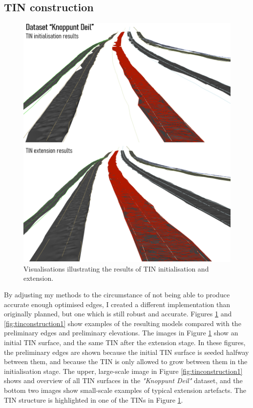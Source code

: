 \subsection{TIN construction}
\label{sub:r_tinconstruction}

\begin{figure}
    \centering
    \includegraphics[width=\linewidth]{final_report/figs/tinconstruction0.png}
    \caption{Visualisations illustrating the results of TIN initialisation and extension.}
    \label{fig:tinconstruction0}
\end{figure}

By adjusting my methods to the circumstance of not being able to produce accurate enough optimised edges, I created a different implementation than originally planned, but one which is still robust and accurate. Figures \ref{fig:tinconstruction0} and \ref{fig:tinconstruction1} show examples of the resulting models compared with the preliminary edges and preliminary elevations. The images in Figure \ref{fig:tinconstruction0} show an initial TIN surface, and the same TIN after the extension stage. In these figures, the preliminary edges are shown because the initial TIN surface is seeded halfway between them, and because the TIN is only allowed to grow between them in the initialisation stage. The upper, large-scale image in Figure \ref{fig:tinconstruction1} shows and overview of all TIN surfaces in the \textit{"Knoppunt Deil"} dataset, and the bottom two images show small-scale examples of typical extension artefacts. The TIN structure is highlighted in one of the TINs in Figure \ref{fig:tinconstruction0}.


